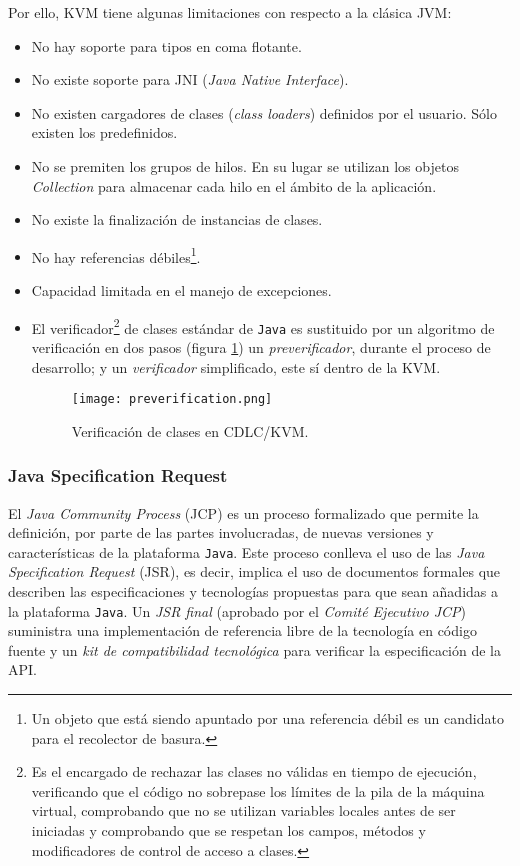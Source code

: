 Por ello, \acs{KVM} tiene algunas limitaciones con respecto a la clásica
\acs{JVM}:
\begin{itemize}
\item No hay soporte para tipos en coma flotante.
\item No existe soporte para \acs{JNI} (\emph{Java Native Interface}).
\item No existen cargadores de clases (\emph{class loaders}) definidos por
el usuario. Sólo existen los predefinidos.
\item No se premiten los grupos de hilos. En su lugar se utilizan los
objetos \emph{Collection} para almacenar cada hilo en el ámbito de la
aplicación.
\item No existe la finalización de instancias de clases.
\item No hay referencias débiles\footnote{Un objeto que está siendo apuntado
por una referencia débil es un candidato para el recolector de basura.}.
\item Capacidad limitada en el manejo de excepciones.
\item El verificador\footnote{Es el encargado de rechazar las clases no válidas 
en tiempo de ejecución, verificando que el código no sobrepase los límites de 
la pila de la máquina virtual, comprobando que no se utilizan variables locales 
antes de ser iniciadas y comprobando que se respetan los campos, métodos y 
modificadores de control de acceso a clases.} de clases estándar de
\texttt{Java} es sustituido por un algoritmo de verificación en dos pasos 
(figura \ref{fig:preverification}) un \emph{preverificador}, durante el proceso 
de desarrollo; y un \emph{verificador} simplificado, este sí dentro de la
\acs{KVM}.

  \begin{figure}[H]
    \begin{center}
      \texttt{[image: preverification.png]}
      \caption{Verificación de clases en \acs{CDLC}/\acs{KVM}.}
      \label{fig:preverification}
    \end{center}
  \end{figure}

\end{itemize}

\subsubsection{Java Specification Request}
El \emph{Java Community Process} (\acs{JCP}) es un proceso formalizado que
permite la definición, por parte de las partes involucradas, de nuevas
versiones y características de la plataforma \texttt{Java}. Este proceso
conlleva el uso de las \emph{Java Specification Request} (\acs{JSR}), es decir,
implica el uso de documentos formales que describen las especificaciones y
tecnologías propuestas para que sean añadidas a la plataforma \texttt{Java}.
Un \emph{\acs{JSR} final} (aprobado por el \emph{Comité Ejecutivo \acs{JCP}})
suministra una implementación de referencia libre de la tecnología en 
código fuente y un \emph{kit de compatibilidad tecnológica} para verificar
la especificación de la \acs{API}.

